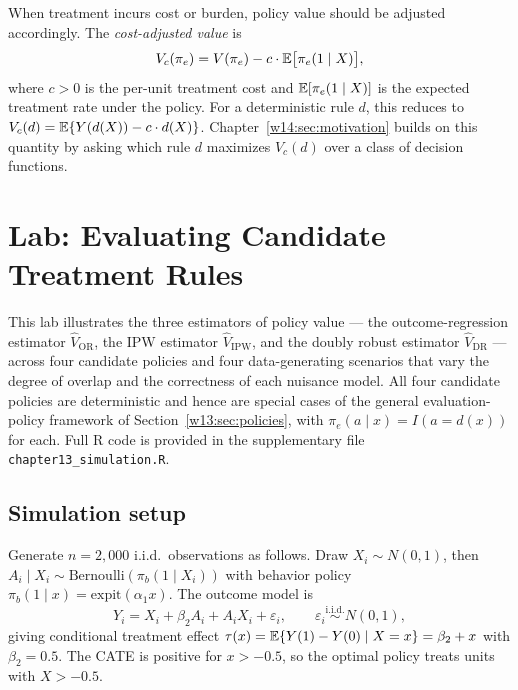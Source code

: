\documentclass[master.tex]{subfiles}
\begin{document}
When treatment incurs cost or burden, policy value should be adjusted accordingly.  The \emph{cost-adjusted value} is
\[
V_c(\pi_e)=V(\pi_e)-c\cdot\mathbb{E}\bigl[\pi_e(1\mid X)\bigr],
\]
where $c>0$ is the per-unit treatment cost and $\mathbb{E}[\pi_e(1\mid X)]$ is the expected treatment rate under the policy.  For a deterministic rule $d$, this reduces to $V_c(d)=\mathbb{E}\{Y(d(X))-c\cdot d(X)\}$.  Chapter~\ref{w14:sec:motivation} builds on this quantity by asking which rule $d$ maximizes $V_c(d)$ over a class of decision functions.

\section{Lab: Evaluating Candidate Treatment Rules}
\label{w13:sec:lab}

This lab illustrates the three estimators of policy value --- the
outcome-regression estimator $\hat V_{\mathrm{OR}}$, the IPW estimator
$\hat V_{\mathrm{IPW}}$, and the doubly robust estimator
$\hat V_{\mathrm{DR}}$ --- across four candidate policies and four
data-generating scenarios that vary the degree of overlap and the
correctness of each nuisance model.  All four candidate policies are
deterministic and hence are special cases of the general evaluation-policy
framework of Section~\ref{w13:sec:policies}, with
$\pi_e(a\mid x)=I(a=d(x))$ for each.  Full \textsf{R} code is provided
in the supplementary file \texttt{chapter13\_simulation.R}.

\subsection{Simulation setup}
\label{w13:subsec:lab-setup}

Generate $n=2{,}000$ i.i.d.\ observations as follows.  Draw
$X_i\sim N(0,1)$, then $A_i\mid X_i\sim
\mathrm{Bernoulli}(\pi_b(1\mid X_i))$ with behavior policy
$\pi_b(1\mid x)=\mathrm{expit}(\alpha_1 x)$.  The outcome model is
\[
Y_i = X_i + \beta_2 A_i + A_i X_i + \varepsilon_i,
\qquad \varepsilon_i \overset{\mathrm{i.i.d.}}{\sim} N(0,1),
\]
giving conditional treatment effect
$\tau(x) = \mathbb{E}\{Y(1)-Y(0)\mid X=x\} = \beta_2 + x$
with $\beta_2=0.5$.
The CATE is positive for $x > -0.5$, so the optimal policy treats
units with $X > -0.5$.
\end{document}
